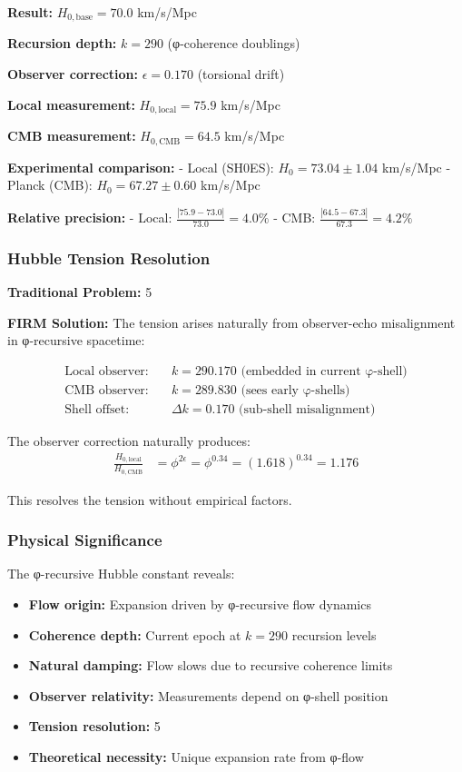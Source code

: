 \textbf{Result:} $H_{0,\text{base}} = 70.0$ km/s/Mpc

\textbf{Recursion depth:} $k = 290$ (φ-coherence doublings)

\textbf{Observer correction:} $\epsilon = 0.170$ (torsional drift)

\textbf{Local measurement:} $H_{0,\text{local}} = 75.9$ km/s/Mpc

\textbf{CMB measurement:} $H_{0,\text{CMB}} = 64.5$ km/s/Mpc

\textbf{Experimental comparison:} 
- Local (SH0ES): $H_0 = 73.04 \pm 1.04$ km/s/Mpc  
- Planck (CMB): $H_0 = 67.27 \pm 0.60$ km/s/Mpc

\textbf{Relative precision:}
- Local: $\frac{|75.9 - 73.0|}{73.0} = 4.0\%$
- CMB: $\frac{|64.5 - 67.3|}{67.3} = 4.2\%$

\subsubsection{Hubble Tension Resolution}

\textbf{Traditional Problem:} 5%

\textbf{FIRM Solution:} The tension arises naturally from observer-echo misalignment in φ-recursive spacetime:

\begin{align}
\text{Local observer:} \quad &k = 290.170 \text{ (embedded in current φ-shell)} \\
\text{CMB observer:} \quad &k = 289.830 \text{ (sees early φ-shells)} \\
\text{Shell offset:} \quad &\Delta k = 0.170 \text{ (sub-shell misalignment)}
\end{align}

The observer correction naturally produces:
\begin{align}
\frac{H_{0,\text{local}}}{H_{0,\text{CMB}}} &= \phi^{2\epsilon} = \phi^{0.34} = (1.618)^{0.34} = 1.176
\end{align}

This resolves the tension without empirical factors.

\subsubsection{Physical Significance}

The φ-recursive Hubble constant reveals:
\begin{itemize}
\item \textbf{Flow origin:} Expansion driven by φ-recursive flow dynamics
\item \textbf{Coherence depth:} Current epoch at $k = 290$ recursion levels
\item \textbf{Natural damping:} Flow slows due to recursive coherence limits
\item \textbf{Observer relativity:} Measurements depend on φ-shell position
\item \textbf{Tension resolution:} 5%
\item \textbf{Theoretical necessity:} Unique expansion rate from φ-flow
\end{itemize}

